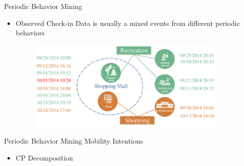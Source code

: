 \documentclass[
 size=14pt,
 paper=smartboard,  %
 mode=present, 		%
 display=slides, 	%
 style=tuliplab,  	%
 pauseslide,
 fleqn,leqno]{powerdot}
\begin{document}
\begin{slide}[toc=,bm=]{Periodic Behavior Mining}

\begin{itemize}
\item
Observed Check-in Data is usually a mixed events from different periodic behaviors

\vspace{1cm}

{
\begin{figure}[htbp]
    \centering
    \includegraphics[width=0.9\textwidth]{figures//theme1//Theme1_18.eps}
\end{figure}
}
\end{itemize}




\end{slide}


\begin{slide}[toc=,bm=]{Periodic Behavior Mining Mobility Intentions}

\begin{itemize}
\item
CP Decomposition

\end{itemize}

\end{slide}
\end{document}
